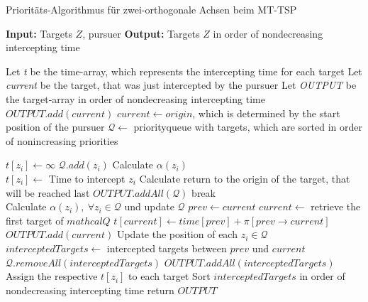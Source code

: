 \documentclass[german,version-2019-11]{uzl-thesis}
\begin{document}
\begin{minipage}{1\linewidth}
\begin{algorithm}[H]
\begin{algorithmic}
\caption{Prioritäts-Algorithmus für zwei-orthogonale Achsen beim MT-TSP}
\label{alg:2OA.1}
\State \textbf{Input:} Targets $Z$, pursuer
\State \textbf{Output:} Targets $Z$ in order of nondecreasing intercepting time

\State Let \emph{t} be the time-array, which represents the intercepting time for each target
\State Let \emph{current} be the target, that was just intercepted by the pursuer
\State Let \emph{OUTPUT} be the target-array in order of nondecreasing intercepting time
\State $OUTPUT.add(current)$
\State $current\leftarrow origin$, which is determined by the start position of the pursuer
\State $\mathcal{Q} \leftarrow$ priorityqueue with targets, which are sorted in order of nonincreasing priorities

\State $t[z_i] \leftarrow \infty$
\State $\mathcal{Q}.add(z_i)$
\State Calculate $\alpha(z_i)$
\EndFor\\

\State $t[z_i] \leftarrow$ Time to intercept $z_i$ 
\EndFor
\State Calculate return to the origin of the target, that will be reached last
\State $OUTPUT.addAll(\mathcal{Q})$
\State break
\EndIf \\

\State Calculate $\alpha(z_i),~\forall z_i\in\mathcal{Q}$ und update $\mathcal{Q}$
\State $prev\leftarrow current$
\State $current \leftarrow$ retrieve the first target of $mathcal{Q}$
\State $t[current] \leftarrow time[prev] + \pi[prev\rightarrow current]$
\State $OUTPUT.add(current)$
\State Update the position of each $z_i\in\mathcal{Q}$
\State $interceptedTargets \leftarrow$ intercepted targets between $prev$ und $current$
\State $\mathcal{Q}.removeAll(interceptedTargets)$
\State $OUTPUT.addAll(interceptedTargets)$
\EndWhile\\

\State Assign the respective $t[z_i]$ to each target
\State Sort $interceptedTargets$ in order of nondecreasing intercepting time 
\State return $OUTPUT$
\end{algorithmic}
\end{algorithm}
\end{minipage}
\end{document}
